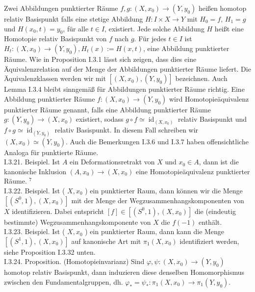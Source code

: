 \documentclass[10pt]{article}
\begin{document}
Zwei Abbildungen punktierter Räume $f, g:\left(X, x_{0}\right) \rightarrow\left(Y, y_{0}\right)$ heißen homotop relativ Basispunkt falls eine stetige Abbildung $H: I \times X \rightarrow Y$ mit $H_{0}=f$, $H_{1}=g$ und $H\left(x_{0}, t\right)=y_{0}$, für alle $t \in I$, existiert. Jede solche Abbildung $H$ heißt eine Homotopie relativ Basispunkt von $f$ nach $g$. Für jedes $t \in I$ ist $H_{t}:\left(X, x_{0}\right) \rightarrow\left(Y, y_{0}\right), H_{t}(x):=H(x, t)$, eine Abbildung punktierter Räume. Wie in Proposition I.3.1 lässt sich zeigen, dass dies eine Äquivalenzrelation auf der Menge der Abbildungen punktierter Räume liefert. Die Äquivalenzklassen werden wir mit $\left[\left(X, x_{0}\right),\left(Y, y_{0}\right)\right]$ bezeichnen. Auch Lemma I.3.4 bleibt sinngemäß für Abbildungen punktierter Räume richtig. Eine Abbildung punktierter Räume $f:\left(X, x_{0}\right) \rightarrow\left(Y, y_{0}\right)$ wird Homotopieäquivalenz punktierter Räume genannt, falls eine Abbildung punktierter Räume $g:\left(Y, y_{0}\right) \rightarrow\left(X, x_{0}\right)$ existiert, sodass $g \circ f \simeq \operatorname{id}_{\left(X, x_{0}\right)}$ relativ Basispunkt und $f \circ g \simeq \operatorname{id}_{\left(Y, y_{0}\right)}$ relativ Basispunkt. In diesem Fall schreiben wir $\left(X, x_{0}\right) \simeq\left(Y, y_{0}\right)$. Auch die Bemerkungen I.3.6 und I.3.7 haben offensichtliche Analoga für punktierte Räume.\\
I.3.21. Beispiel. Ist $A$ ein Deformationsretrakt von $X$ und $x_{0} \in A$, dann ist die kanonische Inklusion $\left(A, x_{0}\right) \rightarrow\left(X, x_{0}\right)$ eine Homotopieäquivalenz punktierter Räume. ${ }^{7}$\\
I.3.22. Beispiel. Ist ( $X, x_{0}$ ) ein punktierter Raum, dann können wir die Menge $\left[\left(S^{0}, 1\right),\left(X, x_{0}\right)\right]$ mit der Menge der Wegzusammenhangskomponenten von $X$ identifizieren. Dabei entspricht $[f] \in\left[\left(S^{0}, 1\right),\left(X, x_{0}\right)\right]$ die (eindeutig bestimmte) Wegzusammenhangskomponente von $X$ die $f(-1)$ enthält.\\
I.3.23. Beispiel. Ist ( $X, x_{0}$ ) ein punktierter Raum, dann kann die Menge $\left[\left(S^{1}, 1\right),\left(X, x_{0}\right)\right]$ auf kanonische Art mit $\pi_{1}\left(X, x_{0}\right)$ identifiziert werden, siehe Proposition I.3.32 unten.\\
I.3.24. Proposition. (Homotopieinvarianz) Sind $\varphi, \psi:\left(X, x_{0}\right) \rightarrow\left(Y, y_{0}\right)$ homotop relativ Basispunkt, dann induzieren diese denselben Homomorphismus zwischen den Fundamentalgruppen, dh. $\varphi_{*}=\psi_{*}: \pi_{1}\left(X, x_{0}\right) \rightarrow \pi_{1}\left(Y, y_{0}\right)$.
\end{document}
